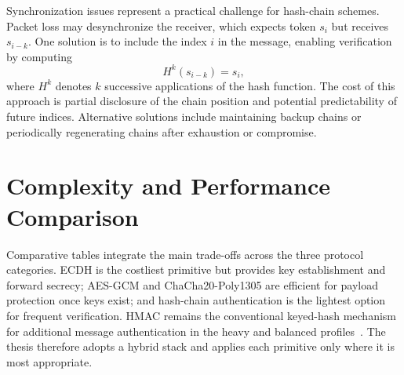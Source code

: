 Synchronization issues represent a practical challenge for hash-chain schemes. Packet loss may desynchronize the receiver, which expects token $s_i$ but receives $s_{i-k}$. One solution is to include the index $i$ in the message, enabling verification by computing
\begin{equation}
H^{k}(s_{i-k}) = s_i,
\label{eq:hash_resync}
\end{equation}
where $H^{k}$ denotes $k$ successive applications of the hash function. The cost of this approach is partial disclosure of the chain position and potential predictability of future indices. Alternative solutions include maintaining backup chains or periodically regenerating chains after exhaustion or compromise.


\section{Complexity and Performance Comparison}
\label{sec:complexity_comparison}

Comparative tables integrate the main trade-offs across the three protocol categories. ECDH is the costliest primitive but provides key establishment and forward secrecy; AES-GCM and ChaCha20-Poly1305 are efficient for payload protection once keys exist; and hash-chain authentication is the lightest option for frequent verification. HMAC remains the conventional keyed-hash mechanism for additional message authentication in the heavy and balanced profiles~\cite{nistFips198HMAC}. The thesis therefore adopts a hybrid stack and applies each primitive only where it is most appropriate.

